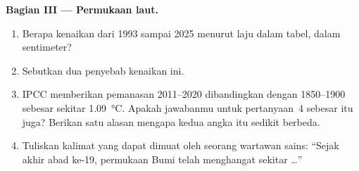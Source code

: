 \begin{problem}
\noindent\textbf{Bagian III --- Permukaan laut.}\par\nopagebreak
\begin{enumerate}[resume, beginpenalty=10000]
  \item Berapa kenaikan  dari 1993 sampai 2025 menurut laju
        dalam tabel, dalam sentimeter?
  \item Sebutkan dua penyebab kenaikan ini.
  \item IPCC memberikan pemanasan 2011--2020 dibandingkan dengan
        1850--1900 sebesar sekitar \qty{1.09}{\degreeCelsius}. Apakah
        jawabanmu untuk pertanyaan~4 sebesar itu juga? Berikan satu alasan
        mengapa kedua angka itu sedikit berbeda.
  \item Tuliskan kalimat yang dapat dimuat oleh seorang wartawan sains:
        ``Sejak akhir abad ke-19, permukaan Bumi telah menghangat sekitar
        \ldots''
\end{enumerate}
\end{problem}
